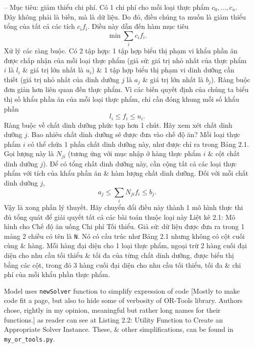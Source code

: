 \documentclass{article}
\begin{document}
\begin{itemize}
\begin{itemize}
\begin{itemize}
            -- Mục tiêu: giảm thiểu chi phí. Có 1 chi phí cho mỗi loại thực phẩm $c_0,\ldots,c_n$. Đây không phải là biến, mà là dữ liệu. Do đó, điều chúng ta muốn là giảm thiểu tổng của tất cả các tích $c_if_i$. Điều này dẫn đến hàm mục tiêu
            \begin{equation*}
                \min\sum_i c_if_i.
            \end{equation*}
            Xử lý các ràng buộc. Có 2 tập hợp: 1 tập hợp biểu thị phạm vi khẩu phần ăn được chấp nhận của mỗi loại thực phẩm (giả sử: giá trị nhỏ nhất của thực phẩm $i$ là $l_i$ \& giá trị lớn nhất là $u_i$) \& 1 tập hợp biểu thị phạm vi dinh dưỡng cần thiết (giá trị nhỏ nhất của dinh dưỡng $j$ là $a_j$ \& giá trị lớn nhất là $b_j$). Ràng buộc đơn giản hơn liên quan đến thực phẩm. Vì các biến quyết định của chúng ta biểu thị số khẩu phần ăn của mỗi loại thực phẩm, chỉ cần đóng khung mỗi số khẩu phần
            \begin{equation*}
                l_i\le f_i\le u_i.
            \end{equation*}
            Ràng buộc về chất dinh dưỡng phức tạp hơn 1 chút. Hãy xem xét chất dinh dưỡng $j$. Bao nhiêu chất dinh dưỡng sẽ được đưa vào chế độ ăn? Mỗi loại thực phẩm $i$ có thể chứa 1 phần chất dinh dưỡng này, như được chỉ ra trong Bảng 2.1. Gọi lượng này là $N_{ji}$ (tương ứng với mục nhập ở hàng thực phẩm $i$ \& cột chất dinh dưỡng $j$). Để có tổng chất dinh dưỡng này, cần cộng tất cả các loại thực phẩm với tích của khẩu phần ăn \& hàm lượng chất dinh dưỡng. Đối với mỗi chất dinh dưỡng $j$,
            \begin{equation*}
                a_j\le\sum_i N_{ji}f_i\le b_j.
            \end{equation*}
            Vậy là xong phần lý thuyết. Hãy chuyển đổi điều này thành 1 mô hình thực thi đủ tổng quát để giải quyết tất cả các bài toán thuộc loại này {\sf Liệt kê 2.1: Mô hình cho Chế độ ăn uống Chi phí Tối thiểu}. Giả sử: dữ liệu được đưa ra trong 1 mảng 2 chiều có tên là {\tt N}. Nó có cấu trúc như Bảng 2.1 nhưng không có cột cuối cùng \& hàng. Mỗi hàng đại diện cho 1 loại thực phẩm, ngoại trừ 2 hàng cuối đại diện cho nhu cầu tối thiểu \& tối đa của từng chất dinh dưỡng, được biểu thị bằng các cột, trong đó 3 hàng cuối đại diện cho nhu cầu tối thiểu, tối đa \& chi phí của mỗi khẩu phần thực phẩm.

            Model uses {\tt newSolver} function to simplify expression of code [Mostly to make code fit a page, but also to hide some of verbosity of OR-Tools library. Authors chose, rightly in my opinion, meaningful but rather long names for their functions.] as reader can see at {\sf Listing 2.2: Utility Function to Create an Appropriate Solver Instance}. These, \& other simplifications, can be found in \verb|my_or_tools.py|.


\end{itemize}
\end{itemize}
\end{itemize}
\end{document}
